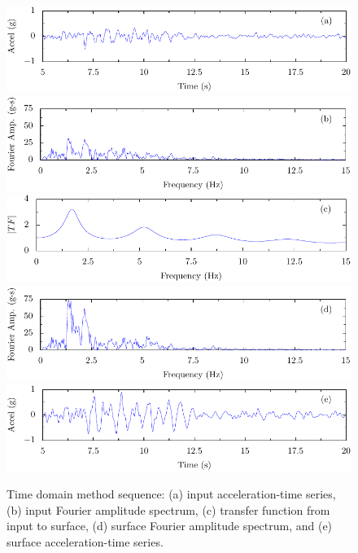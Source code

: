 \documentclass[12pt,oneside]{book}
\begin{document}
\begin{figure}[p]
    \begin{center}
        \includegraphics[width=0.95\linewidth]{figures/siteResponse/td-rock-accel-ts.pdf}
        \includegraphics[width=0.95\linewidth]{figures/siteResponse/td-rock-fas.pdf}
        \includegraphics[width=0.95\linewidth]{figures/siteResponse/td-rock-surface-tf.pdf}
        \includegraphics[width=0.95\linewidth]{figures/siteResponse/td-surface-fas.pdf}
        \includegraphics[width=0.95\linewidth]{figures/siteResponse/td-surface-accel-ts.pdf}
    \end{center}
    \caption[Time domain method sequence]{Time domain method sequence: (a) input acceleration-time series, (b) input
        Fourier amplitude spectrum, (c) transfer function from input to surface, (d) surface Fourier
    amplitude spectrum, and (e) surface acceleration-time series.}
    \label{fig:siteResponse:timeDomainSequence}
\end{figure}
\end{document}
